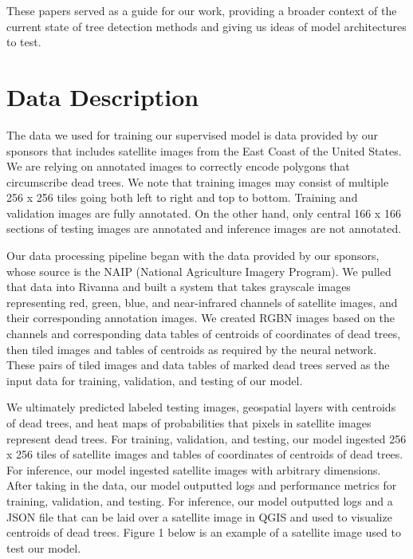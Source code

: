 \documentclass[conference]{ieeetran}
\begin{document}
These papers served as a guide for our work, providing a broader context of the current state of tree detection methods and giving us ideas of model architectures to test.

\section{Data Description}

The data we used for training our supervised model is data provided by our sponsors that includes satellite images from the East Coast of the United States. We are relying on annotated images to correctly encode polygons that circumscribe dead trees. We note that training images may consist of multiple 256 x 256 tiles going both left to right and top to bottom. Training and validation images are fully annotated. On the other hand, only central 166 x 166 sections of testing images are annotated and inference images are not annotated. 

Our data processing pipeline began with the data provided by our sponsors, whose source is the NAIP (National Agriculture Imagery Program). We pulled that data into Rivanna and built a system that takes grayscale images representing red, green, blue, and near-infrared channels of satellite images, and their corresponding annotation images. We created RGBN images based on the channels and corresponding data tables of centroids of coordinates of dead trees, then tiled images and tables of centroids as required by the neural network. These pairs of tiled images and data tables of marked dead trees served as the input data for training, validation, and testing of our model. 

We ultimately predicted labeled testing images, geospatial layers with centroids of dead trees, and heat maps of probabilities that pixels in satellite images represent dead trees. For training, validation, and testing, our model ingested 256 x 256 tiles of satellite images and tables of coordinates of centroids of dead trees. For inference, our model ingested satellite images with arbitrary dimensions. After taking in the data, our model outputted logs and performance metrics for training, validation, and testing. For inference, our model outputted logs and a JSON file that can be laid over a satellite image in QGIS and used to visualize centroids of dead trees. Figure 1 below is an example of a satellite image used to test our model.
\end{document}
